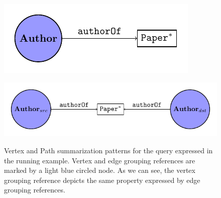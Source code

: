 \begin{figure}[!t]
	\centering
	\begin{minipage}[!t]{1\textwidth}
		\centering
		\includegraphics[width=.5\textwidth]{fig/06nesting/00_vertex_pattern.pdf}
		\label{fig:vertexPat}
	\end{minipage} \begin{minipage}[!t]{1\textwidth}
		\centering
		\includegraphics[width=.5\textwidth]{fig/06nesting/00_path_pattern.pdf}
		\label{fig:pathPat}
	\end{minipage}
	\caption{Vertex and Path summarization patterns for the query expressed in the running example. Vertex and edge grouping references are marked by a light blue circled node. As we can see, the vertex grouping reference depicts the same property expressed by edge grouping references.}
	\label{fig:patterns}
\end{figure}
